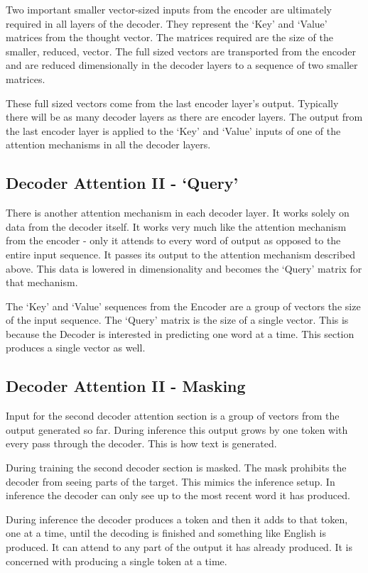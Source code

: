 Two important smaller vector-sized inputs from the encoder are ultimately required in all layers of the decoder. They represent the `Key' and `Value' matrices from the thought vector. The matrices required are the size of the smaller, reduced, vector. The full sized vectors are transported from the encoder and are reduced dimensionally in the decoder layers to a sequence of two smaller matrices. 

These full sized vectors come from the last encoder layer's output. Typically there will be as many decoder layers as there are encoder layers. The output from the last encoder layer is applied to the `Key' and `Value' inputs of one of the attention mechanisms in all the decoder layers.

\subsection{Decoder Attention II - `Query'}
There is another attention mechanism in each decoder layer. It works solely on data from the decoder itself. It works very much like the attention mechanism from the encoder - only it attends to every word of output as opposed to the entire input sequence. It passes its output to the attention mechanism described above. This data is lowered in dimensionality and becomes the `Query' matrix for that mechanism. 

The `Key' and `Value' sequences from the Encoder are a group of vectors the size of the input sequence. The `Query' matrix is the size of a single vector. This is because the Decoder is interested in predicting one word at a time. This section produces a single vector as well.

\subsection{Decoder Attention II - Masking}
Input for the second decoder attention section is a group of vectors from the output generated so far. During inference this output grows by one token with every pass through the decoder. This is how text is generated.

During training the second decoder section is masked. The mask prohibits the decoder from seeing parts of the target. This mimics the inference setup. In inference the decoder can only see up to the most recent word it has produced.

During inference the decoder produces a token and then it adds to that token, one at a time, until the decoding is finished and something like English is produced. It can attend to any part of the output it has already produced. It is concerned with producing a single token at a time.

